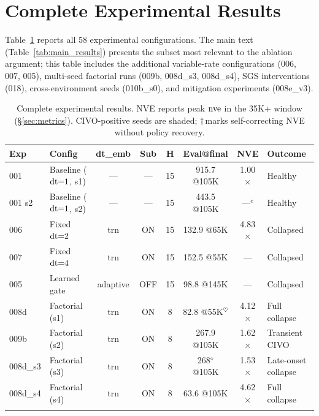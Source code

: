 
\section{Complete Experimental Results}
\label{sec:complete_results}

Table~\ref{tab:complete_results} reports all 58 experimental configurations. The main text (Table~\ref{tab:main_results}) presents the subset most relevant to the ablation argument; this table includes the additional variable-rate configurations (006, 007, 005), multi-seed factorial runs (009b, 008d\_s3, 008d\_s4), SGS interventions (018), cross-environment seeds (010b\_s0), and mitigation experiments (008e\_v3).

\begin{table}[t]
\centering
\caption{Complete experimental results. NVE reports peak $\mathrm{nve}$ in the 35K+ window (\S\ref{sec:metrics}). CIVO-positive seeds are shaded; $\dagger$\,marks self-correcting NVE without policy recovery.}
\label{tab:complete_results}
\scriptsize
\setlength{\tabcolsep}{3pt}
\begin{tabular}{llcccccl}
\toprule
\textbf{Exp} & \textbf{Config} & \textbf{dt\_emb} & \textbf{Sub} & \textbf{H} & \textbf{Eval@final} & \textbf{NVE} & \textbf{Outcome} \\
\midrule
001 & Baseline ($\mathrm{dt}{=}1$, s1) & --- & --- & 15 & 915.7 @105K & 1.00$\times$ & Healthy \\
001 s2 & Baseline ($\mathrm{dt}{=}1$, s2) & --- & --- & 15 & 443.5 @105K & ---$^e$ & Healthy \\
\rowcolor{gray!15}
006 & Fixed $\mathrm{dt}{=}2$ & trn & ON & 15 & 132.9 @65K & 4.83$\times$ & Collapsed \\
007 & Fixed $\mathrm{dt}{=}4$ & trn & ON & 15 & 152.5 @55K & --- & Collapsed \\
005 & Learned gate & adaptive & OFF & 15 & 98.8 @145K & --- & Collapsed \\
\midrule
\rowcolor{gray!15}
008d & Factorial (s1) & trn & ON & 8 & 82.8 @55K$^\heartsuit$ & 4.12$\times$ & Full collapse \\
009b & Factorial (s2) & trn & ON & 8 & 267.9 @105K & 1.62$\times$ & Transient CIVO \\
008d\_s3 & Factorial (s3) & trn & ON & 8 & 268$^\diamond$ @105K & 1.53$\times$ & Late-onset collapse \\
\rowcolor{gray!15}
008d\_s4 & Factorial (s4) & trn & ON & 8 & 63.6 @105K & 4.62$\times$ & Full collapse \\
\rowcolor{gray!15}

\end{tabular}
\end{table}

